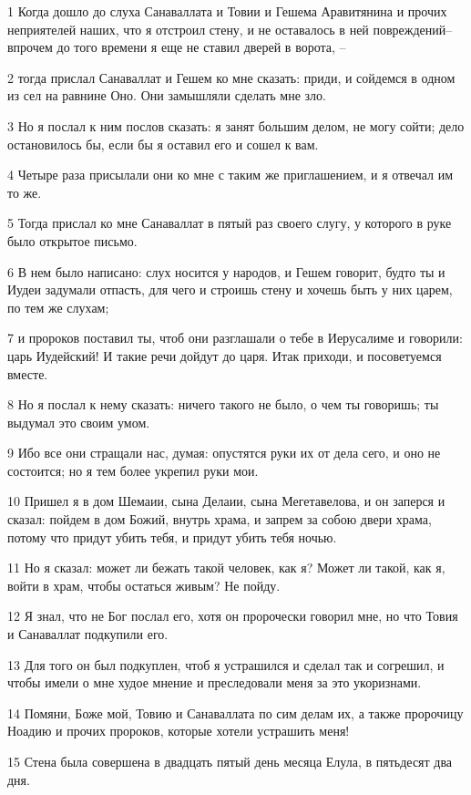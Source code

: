 \par 1 Когда дошло до слуха Санаваллата и Товии и Гешема Аравитянина и прочих неприятелей наших, что я отстроил стену, и не оставалось в ней повреждений--впрочем до того времени я еще не ставил дверей в ворота, --
\par 2 тогда прислал Санаваллат и Гешем ко мне сказать: приди, и сойдемся в одном из сел на равнине Оно. Они замышляли сделать мне зло.
\par 3 Но я послал к ним послов сказать: я занят большим делом, не могу сойти; дело остановилось бы, если бы я оставил его и сошел к вам.
\par 4 Четыре раза присылали они ко мне с таким же приглашением, и я отвечал им то же.
\par 5 Тогда прислал ко мне Санаваллат в пятый раз своего слугу, у которого в руке было открытое письмо.
\par 6 В нем было написано: слух носится у народов, и Гешем говорит, будто ты и Иудеи задумали отпасть, для чего и строишь стену и хочешь быть у них царем, по тем же слухам;
\par 7 и пророков поставил ты, чтоб они разглашали о тебе в Иерусалиме и говорили: царь Иудейский! И такие речи дойдут до царя. Итак приходи, и посоветуемся вместе.
\par 8 Но я послал к нему сказать: ничего такого не было, о чем ты говоришь; ты выдумал это своим умом.
\par 9 Ибо все они стращали нас, думая: опустятся руки их от дела сего, и оно не состоится; но я тем более укрепил руки мои.
\par 10 Пришел я в дом Шемаии, сына Делаии, сына Мегетавелова, и он заперся и сказал: пойдем в дом Божий, внутрь храма, и запрем за собою двери храма, потому что придут убить тебя, и придут убить тебя ночью.
\par 11 Но я сказал: может ли бежать такой человек, как я? Может ли такой, как я, войти в храм, чтобы остаться живым? Не пойду.
\par 12 Я знал, что не Бог послал его, хотя он пророчески говорил мне, но что Товия и Санаваллат подкупили его.
\par 13 Для того он был подкуплен, чтоб я устрашился и сделал так и согрешил, и чтобы имели о мне худое мнение и преследовали меня за это укоризнами.
\par 14 Помяни, Боже мой, Товию и Санаваллата по сим делам их, а также пророчицу Ноадию и прочих пророков, которые хотели устрашить меня!
\par 15 Стена была совершена в двадцать пятый день месяца Елула, в пятьдесят два дня.
